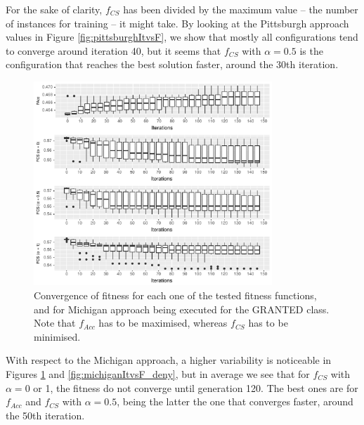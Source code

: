 \documentclass[runningheads]{llncs}
\begin{document}
For the sake of clarity, $f_{CS}$ has been divided by the maximum
value -- the number of instances for training -- it might take. By
looking at the Pittsburgh approach values in Figure
\ref{fig:pittsburghItvsF}, we show that mostly all configurations tend to converge around iteration 40, but it seems that $f_{CS}$ with
$\alpha = 0.5$ is the configuration that reaches the best solution
faster, around the 30th iteration.  

\begin{figure}[h!tb]
	\centering
	\includegraphics[width=0.8\textwidth]{img/michiganItvsF_allow.pdf}
	\caption{Convergence of fitness for each one of the tested fitness functions, and for Michigan approach being executed for the GRANTED class. Note that $f_{Acc}$ has to be maximised, whereas $f_{CS}$ has to be minimised.}
	\label{fig:michiganItvsF_allow}
\end{figure}

With respect to the Michigan approach, a higher variability is noticeable in Figures \ref{fig:michiganItvsF_allow} and \ref{fig:michiganItvsF_deny}, but in average we see that for $f_{CS}$ with $\alpha = 0$ or 1, the fitness do not converge until generation 120. The best ones are for $f_{Acc}$ and $f_{CS}$ with $\alpha = 0.5$, being the latter the one that converges faster, around the 50th iteration.
\end{document}
